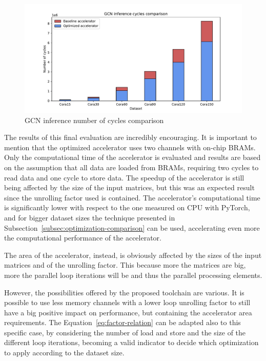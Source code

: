 \begin{figure}[t!]
    \centering
    \includegraphics[height=0.4\textwidth]{Images/gcn_forward_cycles_comparison}
    \caption{GCN inference number of cycles comparison}
    \label{fig:gcn-inference-cycles-comparison}
\end{figure}

The results of this final evaluation are incredibly encouraging.
It is important to mention that the optimized accelerator uses two channels with on-chip BRAMs.
Only the computational time of the accelerator is evaluated and results are based on the assumption that all data are loaded from BRAMs, requiring two cycles to read data and one cycle to store data.
The speedup of the accelerator is still being affected by the size of the input matrices, but this was an expected result since the unrolling factor used is contained.
The accelerator's computational time is significantly lower with respect to the one measured on CPU with PyTorch, and for bigger dataset sizes the technique presented in Subsection~\ref{subsec:optimization-comparison} can be used, accelerating even more the computational performance of the accelerator.

The area of the accelerator, instead, is obviously affected by the sizes of the input matrices and of the unrolling factor.
This because more the matrices are big, more the parallel loop iterations will be and thus the parallel processing elements.

However, the possibilities offered by the proposed toolchain are various.
It is possible to use less memory channels with a lower loop unrolling factor to still have a big positive impact on performance, but containing the accelerator area requirements.
The Equation~\ref{eq:factor-relation} can be adapted also to this specific case, by considering the number of load and store and the size of the different loop iterations, becoming a valid indicator to decide which optimization to apply according to the dataset size.

